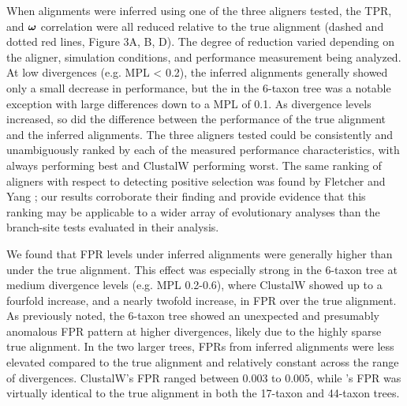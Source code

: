 \documentclass{mbe}
\begin{document}
When alignments were inferred using one of the three aligners tested,
the TPR, \tpr{} and $\bm{\omega}{}$ correlation were all reduced relative to
the true alignment (dashed and dotted red lines, Figure 3A, B, D). The
degree of reduction varied depending on the aligner, simulation
conditions, and performance measurement being analyzed. At low
divergences (e.g. MPL < 0.2), the inferred alignments generally showed
only a small decrease in performance, but the \tpr{} in the 6-taxon
tree was a notable exception with large differences down to a MPL of
0.1. As divergence levels increased, so did the difference between the
performance of the true alignment and the inferred alignments. The
three aligners tested could be consistently and unambiguously ranked
by each of the measured performance characteristics, with \prankc{}
always performing best and ClustalW performing worst. The same ranking
of aligners with respect to detecting positive selection was found by
Fletcher and Yang \citeyearpar{Fletcher2010Effect}; our results
corroborate their finding and provide evidence that this ranking may
be applicable to a wider array of evolutionary analyses than the
branch-site tests evaluated in their analysis.

We found that FPR levels under inferred alignments were generally
higher than under the true alignment. This effect was especially
strong in the 6-taxon tree at medium divergence levels (e.g. MPL
0.2-0.6), where ClustalW showed up to a fourfold increase, and \prankc{}
a nearly twofold increase, in FPR over the true alignment. As
previously noted, the 6-taxon tree showed an unexpected and presumably
anomalous FPR pattern at higher divergences, likely due to the highly
sparse true alignment. In the two larger trees, FPRs from inferred
alignments were less elevated compared to the true alignment and
relatively constant across the range of divergences. ClustalW's FPR
ranged between 0.003 to 0.005, while \prankc{}'s FPR was virtually
identical to the true alignment in both the 17-taxon and 44-taxon
trees.
\end{document}
